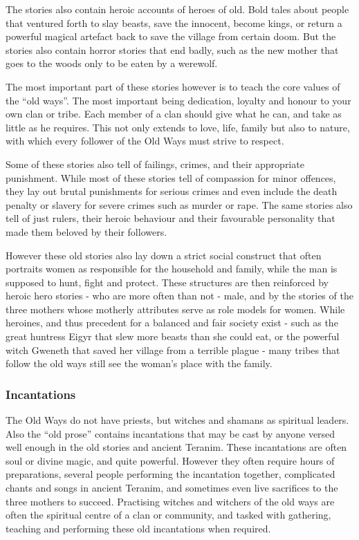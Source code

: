 The stories also contain heroic accounts of heroes of old. Bold tales about
people that ventured forth to slay beasts, save the innocent, become kings, or
return a powerful magical artefact back to save the village from certain doom.
But the stories also contain horror stories that end badly, such as the new
mother that goes to the woods only to be eaten by a werewolf.

The most important part of these stories however is to teach the core values
of the ``old ways''. The most important being dedication, loyalty and honour
to your own clan or tribe. Each member of a clan should give what he can, and
take as little as he requires. This not only extends to love, life, family but
also to nature, with which every follower of the Old Ways must strive to
respect.

Some of these stories also tell of failings, crimes, and their appropriate
punishment. While most of these stories tell of compassion for minor offences,
they lay out brutal punishments for serious crimes and even include the death
penalty or slavery for severe crimes such as murder or rape. The same stories
also tell of just rulers, their heroic behaviour and their favourable
personality that made them beloved by their followers.

However these old stories also lay down a strict social construct that often
portraits women as responsible for the household and family, while the man is
supposed to hunt, fight and protect. These structures are then reinforced by
heroic hero stories - who are more often than not - male, and by the stories
of the three mothers whose motherly attributes serve as role models for women.
While heroines, and thus precedent for a balanced and fair society exist - such
as the great huntress Eigyr that slew more beasts than she could eat, or the
powerful witch Gweneth that saved her village from a terrible plague - many
tribes that follow the old ways still see the woman's place with the family.

\subsubsection{Incantations}

The Old Ways do not have priests, but witches and shamans as spiritual
leaders. Also the ``old prose'' contains incantations that may be cast by
anyone versed well enough in the old stories and ancient Teranim. These
incantations are often soul or divine magic, and quite powerful. However they
often require hours of preparations, several people performing the incantation
together, complicated chants and songs in ancient Teranim, and sometimes even
live sacrifices to the three mothers to succeed. Practising witches and
witchers of the old ways are often the spiritual centre of a clan or
community, and tasked with gathering, teaching and performing these old
incantations when required.
